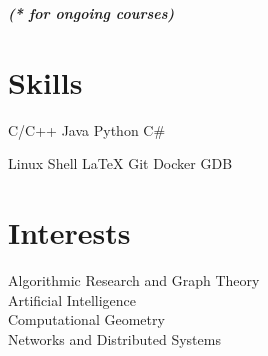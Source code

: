 \documentclass[a4paper]{deedy-resume} %
\begin{document}
\begin{minipage}[t]{0.33\textwidth}
  {\footnotesize \textit{\textbf{(* for ongoing courses) }}} \\

  \sectionspace

  \section{Skills}

  \runsubsection{}
  C/C++ \textbullet{} Java \textbullet{} Python \textbullet{} C#

  \sectionspace
  \sectionspace

  Linux Shell \textbullet{} LaTeX \textbullet{}
  Git \textbullet{} Docker \textbullet{}
  GDB \textbullet{}

  \sectionspace
  \sectionspace

  \section{Interests}
  Algorithmic Research and Graph Theory\\
  Artificial Intelligence\\
  Computational Geometry\\
  Networks and Distributed Systems\\

\end{minipage}
\hfill
\end{document}
